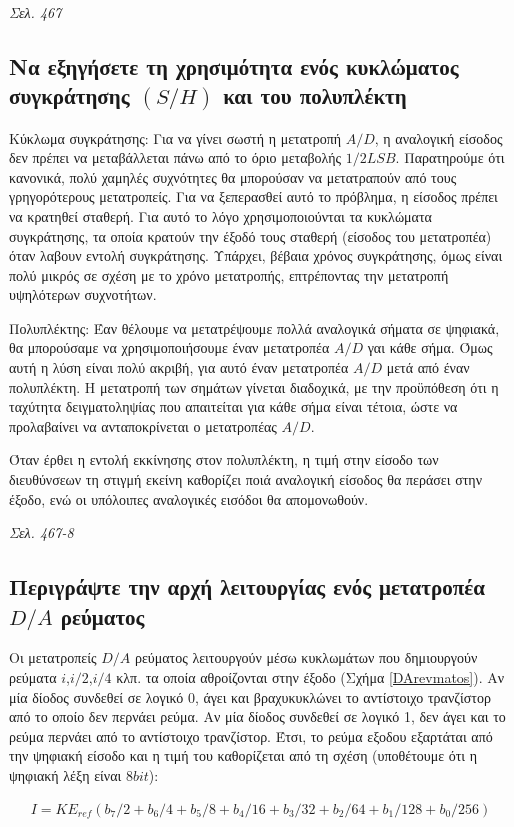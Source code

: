\documentclass{article}
\begin{document}
\emph{Σελ. 467}

\subsection{Να εξηγήσετε τη χρησιμότητα ενός κυκλώματος συγκράτησης $(S/H)$ και του πολυπλέκτη}
Κύκλωμα συγκράτησης: Για να γίνει σωστή η μετατροπή $A/D$, η αναλογική είσοδος δεν πρέπει να μεταβάλλεται πάνω από το όριο μεταβολής $1/2LSB$. Παρατηρούμε ότι κανονικά,
πολύ χαμηλές συχνότητες θα μπορούσαν να μετατραπούν από τους γρηγορότερους μετατροπείς. Για να ξεπερασθεί αυτό το πρόβλημα, η είσοδος πρέπει να κρατηθεί σταθερή. Για
αυτό το λόγο χρησιμοποιούνται τα κυκλώματα συγκράτησης, τα οποία κρατούν την έξοδό τους σταθερή (είσοδος του μετατροπέα) όταν λαβουν εντολή συγκράτησης. Υπάρχει, 
βέβαια χρόνος συγκράτησης, όμως είναι πολύ μικρός σε σχέση με το χρόνο μετατροπής, επτρέποντας την μετατροπή υψηλότερων συχνοτήτων.

Πολυπλέκτης: Έαν θέλουμε να μετατρέψουμε πολλά αναλογικά σήματα σε ψηφιακά, θα μπορούσαμε να χρησιμοποιήσουμε έναν μετατροπέα $A/D$ γαι κάθε σήμα. Όμως αυτή η λύση είναι
πολύ ακριβή, για αυτό έναν μετατροπέα $A/D$ μετά από έναν πολυπλέκτη. Η μετατροπή των σημάτων γίνεται διαδοχικά, με την προϋπόθεση ότι η ταχύτητα δειγματοληψίας που
απαιτείται για κάθε σήμα είναι τέτοια, ώστε να προλαβαίνει να ανταποκρίνεται ο μετατροπέας $A/D$.

Όταν έρθει η εντολή εκκίνησης στον πολυπλέκτη, η τιμή στην είσοδο των διευθύνσεων τη στιγμή εκείνη καθορίζει ποιά αναλογική είσοδος θα περάσει στην έξοδο, ενώ οι 
υπόλοιπες αναλογικές εισόδοι θα απομονωθούν.

\emph{Σελ. 467-8}

\subsection{Περιγράψτε την αρχή λειτουργίας ενός μετατροπέα $D/A$ ρεύματος}
Οι μετατροπείς $D/A$ ρεύματος λειτουργούν μέσω κυκλωμάτων που δημιουργούν ρεύματα $i$,$i/2$,$i/4$ κλπ. τα οποία αθροίζονται στην έξοδο (Σχήμα \ref{DArevmatos}). Αν μία δίοδος συνδεθεί σε λογικό 0, άγει και 
βραχυκυκλώνει το αντίστοιχο τρανζίστορ από το οποίο δεν περνάει ρεύμα. Αν μία δίοδος συνδεθεί σε λογικό 1, δεν άγει και το ρεύμα περνάει από το αντίστοιχο τρανζίστορ. Έτσι, το 
ρεύμα εξοδου εξαρτάται από την ψηφιακή είσοδο και η τιμή του καθορίζεται από τη σχέση (υποθέτουμε ότι η ψηφιακή λέξη είναι $8 bit$):

\begin{align*}
    I = K E_{ref} \left( b_7/2 + b_6/4 + b_5/8 + b_4/16 +b_3/32 + b_2/64 + b_1/128 + b_0/256 \right)
\end{align*}
\end{document}

